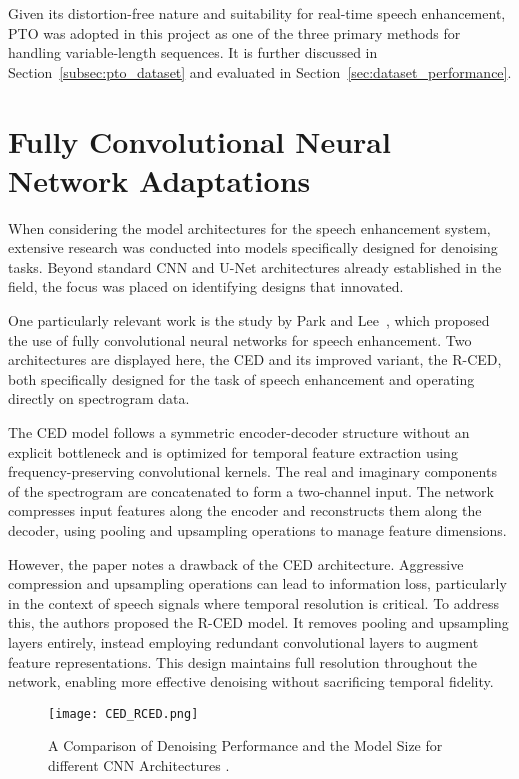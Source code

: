 Given its distortion-free nature and suitability for real-time speech enhancement, PTO was adopted in this project as one of the three primary methods for handling variable-length sequences. It is further discussed in Section~\ref{subsec:pto_dataset} and evaluated in Section~\ref{sec:dataset_performance}.

\section{Fully Convolutional Neural Network Adaptations}
\label{sec:fcns}

When considering the model architectures for the speech enhancement system, extensive research was conducted into models specifically designed for denoising tasks. Beyond standard CNN and U-Net architectures already established in the field, the focus was placed on identifying designs that innovated.

One particularly relevant work is the study by Park and Lee~\cite{park2017acoustic}, which proposed the use of fully convolutional neural networks for speech enhancement. Two architectures are displayed here, the CED and its improved variant, the R-CED, both specifically designed for the task of speech enhancement and operating directly on spectrogram data.

The CED model follows a symmetric encoder-decoder structure without an explicit bottleneck and is optimized for temporal feature extraction using frequency-preserving convolutional kernels. The real and imaginary components of the spectrogram are concatenated to form a two-channel input. The network compresses input features along the encoder and reconstructs them along the decoder, using pooling and upsampling operations to manage feature dimensions.

However, the paper notes a drawback of the CED architecture. Aggressive compression and upsampling operations can lead to information loss, particularly in the context of speech signals where temporal resolution is critical. To address this, the authors proposed the R-CED model. It removes pooling and upsampling layers entirely, instead employing redundant convolutional layers to augment feature representations. This design maintains full resolution throughout the network, enabling more effective denoising without sacrificing temporal fidelity.

\begin{figure}[H]
    \centering
    \texttt{[image: CED\_RCED.png]}
    \caption{A Comparison of Denoising Performance and the
    Model Size for different CNN Architectures \cite{park2017acoustic}.}
    \label{fig:fcns_results}
\end{figure}

